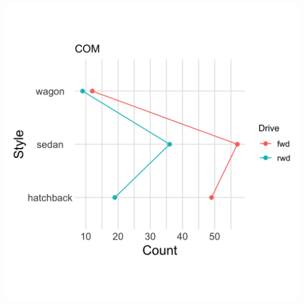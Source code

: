 \documentclass[]{article}
\newcommand{\setwidth}{0.40\textwidth}
\begin{document}
\centering




\hspace*{\fill}
\begin{minipage}{\setwidth}
  \centering
  \includegraphics[width=1.00\textwidth]{../images/01_common_scale}
\end{minipage} %
\hfill\vline\hfill
\end{document}
